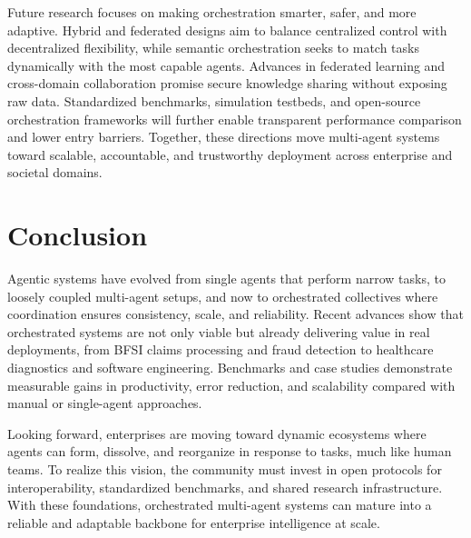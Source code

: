 \documentclass[conference]{IEEEtran}
\begin{document}
Future research focuses on making orchestration smarter, safer, and more adaptive. Hybrid and federated designs aim to balance centralized control with decentralized flexibility, while semantic orchestration seeks to match tasks dynamically with the most capable agents. Advances in federated learning and cross-domain collaboration promise secure knowledge sharing without exposing raw data. Standardized benchmarks, simulation testbeds, and open-source orchestration frameworks will further enable transparent performance comparison and lower entry barriers. Together, these directions move multi-agent systems toward scalable, accountable, and trustworthy deployment across enterprise and societal domains.

\section{Conclusion}

Agentic systems have evolved from single agents that perform narrow tasks, to loosely coupled multi-agent setups, and now to orchestrated collectives where coordination ensures consistency, scale, and reliability. Recent advances show that orchestrated systems are not only viable but already delivering value in real deployments, from BFSI claims processing and fraud detection to healthcare diagnostics and software engineering. Benchmarks and case studies demonstrate measurable gains in productivity, error reduction, and scalability compared with manual or single-agent approaches. 

Looking forward, enterprises are moving toward dynamic ecosystems where agents can form, dissolve, and reorganize in response to tasks, much like human teams. To realize this vision, the community must invest in open protocols for interoperability, standardized benchmarks, and shared research infrastructure. With these foundations, orchestrated multi-agent systems can mature into a reliable and adaptable backbone for enterprise intelligence at scale. 
\end{document}
